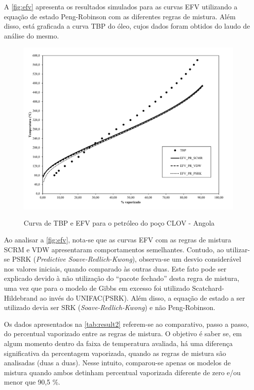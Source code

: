 A \autoref{fig:efv} apresenta os resultados simulados para as curvas EFV
utilizando a equação de estado Peng-Robinson com as diferentes regras de
mistura. Além disso, está graficada a curva TBP do óleo, cujos dados foram
obtidos do laudo de análise do mesmo.
\clearpage

\begin{figure}[htb]
\centering
{\includegraphics[width=1.0\textwidth]{img/trab3.pdf}} 
\caption{Curva de TBP e EFV para o petróleo do poço CLOV - Angola}
\label{fig:efv}
\end{figure} 


Ao analisar a \autoref{fig:efv}, nota-se que as curvas EFV com as regras de
mistura SCRM e VDW apresentaram comportamentos semelhantes. Contudo, ao
utilizar-se PSRK (\emph{Predictive Soave-Redlich-Kwong}), observa-se um desvio
considerável nos valores iniciais, quando comparado às outras duas. Este fato pode ser explicado devido à não utilização
do ``pacote fechado'' desta regra de mistura, uma vez que para o modelo de Gibbs
em excesso foi utilizado Scatchard-Hildebrand ao invés do UNIFAC(PSRK). Além
disso, a equação de estado a ser utilizado devia ser SRK
(\emph{Soave-Redlich-Kwong}) e não Peng-Robinson.

Os dados apresentados na \autoref{tab:result2} referem-se ao comparativo, passo
a passo, do percentual vaporizado entre as regras de mistura. O objetivo é saber
se, em algum momento dentro da faixa de temperatura avaliada, há uma
diferença significativa da percentagem vaporizada, quando as regras de mistura
são analisadas (duas a duas). Nesse intuito, comparou-se apenas os modelos de
mistura quando ambos detinham percentual vaporizada diferente de zero e/ou menor
que 90,5 {\%}.

